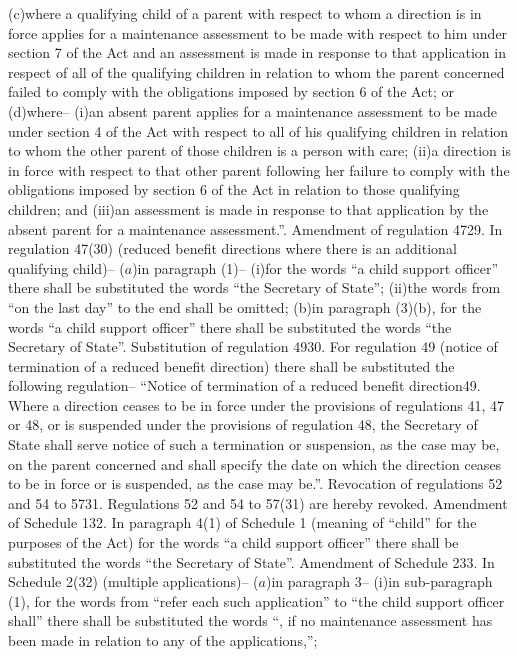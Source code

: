 \documentclass[12pt,a4paper]{article}
\begin{document}
(c)where a qualifying child of a parent with respect to whom a direction is in force applies for a maintenance assessment to be made with respect to him under section 7 of the Act and an assessment is made in response to that application in respect of all of the qualifying children in relation to whom the parent concerned failed to comply with the obligations imposed by section 6 of the Act; or
(d)where–
(i)an absent parent applies for a maintenance assessment to be made under section 4 of the Act with respect to all of his qualifying children in relation to whom the other parent of those children is a person with care;
(ii)a direction is in force with respect to that other parent following her failure to comply with the obligations imposed by section 6 of the Act in relation to those qualifying children; and
(iii)an assessment is made in response to that application by the absent parent for a maintenance assessment.”.
Amendment of regulation 4729.  In regulation 47(30) (reduced benefit directions where there is an additional qualifying child)–
($a$)in paragraph (1)–
(i)for the words “a child support officer” there shall be substituted the words “the Secretary of State”;
(ii)the words from “on the last day” to the end shall be omitted;
(b)in paragraph (3)(b), for the words “a child support officer” there shall be substituted the words “the Secretary of State”.
Substitution of regulation 4930.  For regulation 49 (notice of termination of a reduced benefit direction) there shall be substituted the following regulation–
“Notice of termination of a reduced benefit direction49.  Where a direction ceases to be in force under the provisions of regulations 41, 47 or 48, or is suspended under the provisions of regulation 48, the Secretary of State shall serve notice of such a termination or suspension, as the case may be, on the parent concerned and shall specify the date on which the direction ceases to be in force or is suspended, as the case may be.”.
Revocation of regulations 52 and 54 to 5731.  Regulations 52 and 54 to 57(31) are hereby revoked.
Amendment of Schedule 132.  In paragraph 4(1) of Schedule 1 (meaning of “child” for the purposes of the Act) for the words “a child support officer” there shall be substituted the words “the Secretary of State”.
Amendment of Schedule 233.  In Schedule 2(32) (multiple applications)–
($a$)in paragraph 3–
(i)in sub-paragraph (1), for the words from “refer each such application” to “the child support officer shall” there shall be substituted the words “, if no maintenance assessment has been made in relation to any of the applications,”;
\end{document}
